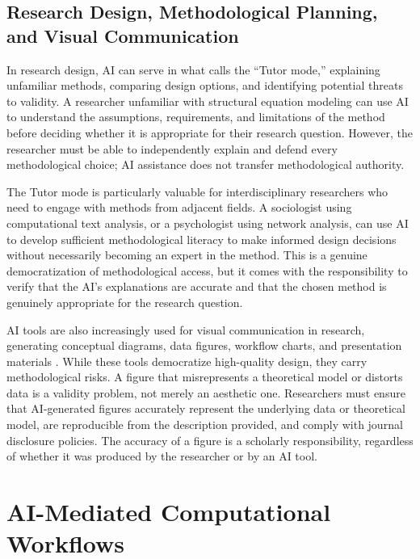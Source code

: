 \documentclass[12pt, a4paper]{article}
\begin{document}
\subsection{Research Design, Methodological Planning, and Visual Communication}

In research design, AI can serve in what \citet{zyphur2026responsible} calls the ``Tutor mode,'' explaining unfamiliar methods, comparing design options, and identifying potential threats to validity. A researcher unfamiliar with structural equation modeling can use AI to understand the assumptions, requirements, and limitations of the method before deciding whether it is appropriate for their research question. However, the researcher must be able to independently explain and defend every methodological choice; AI assistance does not transfer methodological authority.

The Tutor mode is particularly valuable for interdisciplinary researchers who need to engage with methods from adjacent fields. A sociologist using computational text analysis, or a psychologist using network analysis, can use AI to develop sufficient methodological literacy to make informed design decisions without necessarily becoming an expert in the method. This is a genuine democratization of methodological access, but it comes with the responsibility to verify that the AI's explanations are accurate and that the chosen method is genuinely appropriate for the research question.

AI tools are also increasingly used for visual communication in research, generating conceptual diagrams, data figures, workflow charts, and presentation materials \citep{arxiv2026figures}. While these tools democratize high-quality design, they carry methodological risks. A figure that misrepresents a theoretical model or distorts data is a validity problem, not merely an aesthetic one. Researchers must ensure that AI-generated figures accurately represent the underlying data or theoretical model, are reproducible from the description provided, and comply with journal disclosure policies. The accuracy of a figure is a scholarly responsibility, regardless of whether it was produced by the researcher or by an AI tool.

\section{AI-Mediated Computational Workflows}
\end{document}
